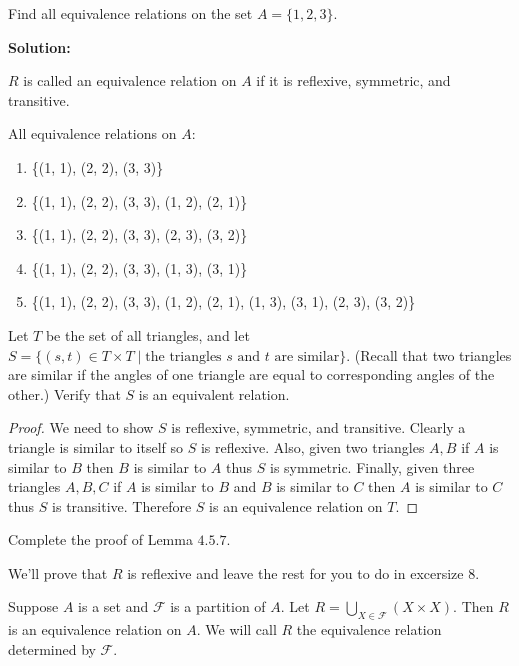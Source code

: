 \begin{tcolorbox}[title=Problem 2, breakable]
    Find all equivalence relations on the set $A = \{1, 2, 3\}$.
\end{tcolorbox}

\textbf{Solution:}

$R$ is called an equivalence relation on $A$ if it is reflexive,
    symmetric, and transitive.

All equivalence relations on $A$:
\begin{enumerate}
    \item \{(1, 1), (2, 2), (3, 3)\}
    \item \{(1, 1), (2, 2), (3, 3), (1, 2), (2, 1)\}
    \item \{(1, 1), (2, 2), (3, 3), (2, 3), (3, 2)\}
    \item \{(1, 1), (2, 2), (3, 3), (1, 3), (3, 1)\}
    \item \{(1, 1), (2, 2), (3, 3), (1, 2), (2, 1), (1, 3), (3, 1), (2, 3), (3, 2)\}
\end{enumerate}

\begin{tcolorbox}[title=Problem 7, breakable]
    Let $T$ be the set of all triangles, and let 
        $S = \{(s, t) \in T \times T \mid \text{the triangles $s$ and $t$ are similar}\}$.
    (Recall that two triangles are similar if the angles of one triangle are equal to 
        corresponding angles of the other.) Verify that $S$ is an equivalent relation.
\end{tcolorbox}

\begin{proof}
    We need to show $S$ is reflexive, symmetric, and transitive.
    Clearly a triangle is similar to itself so $S$ is reflexive.
    Also, given two triangles $A, B$ if $A$ is similar to $B$ then $B$ is similar to $A$
        thus $S$ is symmetric.
    Finally, given three triangles $A, B, C$ if $A$ is similar to $B$ and $B$ is similar to 
        $C$ then $A$ is similar to $C$ thus $S$ is transitive.
    Therefore $S$ is an equivalence relation on $T$.
\end{proof}

\begin{tcolorbox}[title=Problem 8, breakable]
    Complete the proof of Lemma $4.5.7$.

    We'll prove that $R$ is reflexive and leave the rest for you 
        to do in excersize $8$.
\end{tcolorbox}

\begin{lemma}
    Suppose $A$ is a set and $\mathcal{F}$ is a partition of $A$.
    Let $R = \bigcup_{X \in \mathcal{F}}(X \times X)$.
    Then $R$ is an equivalence relation on $A$.
    We will call $R$ the equivalence relation determined by $\mathcal{F}$.
\end{lemma}

